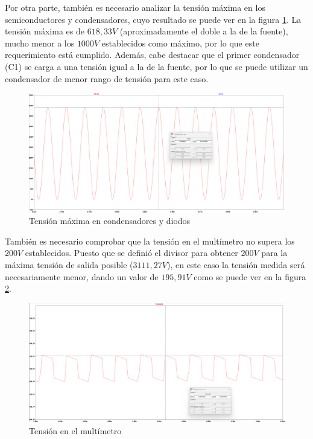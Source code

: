 Por otra parte, también es necesario analizar la tensión máxima en los semiconductores y condensadores, cuyo resultado se puede ver en la figura \ref{Vmax}.
La tensión máxima es de $618,33V$ (aproximadamente el doble a la de la fuente), mucho menor a los $1000V$ 
establecidos como máximo, por lo que este requerimiento está cumplido. Además, cabe destacar que el primer 
condensador (C1) se carga a una tensión igual a la de la fuente, por lo que se puede utilizar un condensador de menor rango de tensión para este caso.

\begin{figure}[H]
    \centering
    \includegraphics[width=1\textwidth]{Imagenes_alvaro/Vmax.png}
    \caption{Tensión máxima en condensadores y diodos}
    \label{Vmax}
\end{figure}

También es necesario comprobar que la tensión en el multímetro no supera los $200V$ establecidos. Puesto que se definió el divisor para obtener $200V$
para la máxima tensión de salida posible ($3111,27V$), en este caso la tensión medida será necesariamente menor, dando un valor de $195,91V$ como se puede ver en la figura
\ref{V_mult}.

\begin{figure}[H]
    \centering
    \includegraphics[width=1\textwidth]{Imagenes_alvaro/V_mult.png}
    \caption{Tensión en el multímetro}
    \label{V_mult}
\end{figure}

